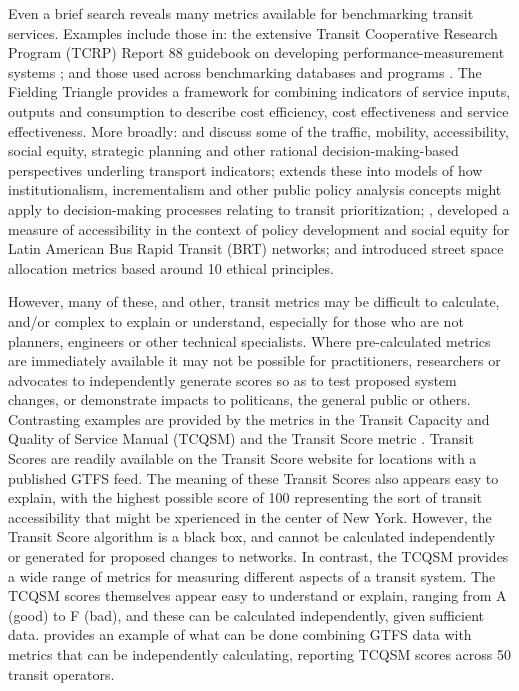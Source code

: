 \documentclass[preprint, 3p,
authoryear]{elsarticle} %
\begin{document}
Even a brief search reveals many metrics available for benchmarking
transit services. Examples include those in: the extensive Transit
Cooperative Research Program (TCRP) Report 88 guidebook on developing
performance-measurement systems \citep{Ryus:2003aa}; and those used
across benchmarking databases and programs
\citep{Florida-Transit-Information-System:2018aa, UITP:2015aa, Imperial-College-London:2023aa}.
The Fielding Triangle \citep{FieldingGordonJ1987Mpts} provides a
framework for combining indicators of service inputs, outputs and
consumption to describe cost efficiency, cost effectiveness and service
effectiveness. More broadly: \citet{Litman:2003ab} and
\citet{Litman:2016aa} discuss some of the traffic, mobility,
accessibility, social equity, strategic planning and other rational
decision-making-based perspectives underling transport indicators;
\citet{Reynolds:2017ah} extends these into models of how
institutionalism, incrementalism and other public policy analysis
concepts might apply to decision-making processes relating to transit
prioritization; \citet{GuzmanLuisA.2017Aeit}, developed a measure of
accessibility in the context of policy development and social equity for
Latin American Bus Rapid Transit (BRT) networks; and
\citet{Creutzig2020streetspaceallocation} introduced street space
allocation metrics based around 10 ethical principles.

However, many of these, and other, transit metrics may be difficult to
calculate, and/or complex to explain or understand, especially for those
who are not planners, engineers or other technical specialists. Where
pre-calculated metrics are immediately available it may not be possible
for practitioners, researchers or advocates to independently generate
scores so as to test proposed system changes, or demonstrate impacts to
politicans, the general public or others. Contrasting examples are
provided by the metrics in the Transit Capacity and Quality of Service
Manual (TCQSM) and the Transit Score metric \citep{WalkScore:2023tg}.
Transit Scores are readily available on the Transit Score website for
locations with a published GTFS feed. The meaning of these Transit
Scores also appears easy to explain, with the highest possible score of
100 representing the sort of transit accessibility that might be
xperienced in the center of New York. However, the Transit Score
algorithm is a black box, and cannot be calculated independently or
generated for proposed changes to networks. In contrast, the TCQSM
provides a wide range of metrics for measuring different aspects of a
transit system. The TCQSM scores themselves appear easy to understand or
explain, ranging from A (good) to F (bad), and these can be calculated
independently, given sufficient data. \citet{Wong:2013aa} provides an
example of what can be done combining GTFS data with metrics that can be
independently calculating, reporting TCQSM scores across 50 transit
operators.
\end{document}
